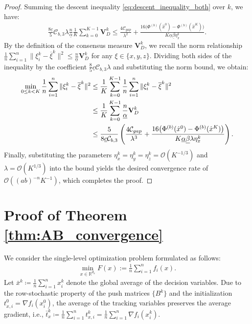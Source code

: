 \documentclass{article}
\theoremstyle{plain}
\theoremstyle{definition}
\theoremstyle{remark}
\begin{document}
\begin{proof}
 Summing the descent inequality \eqref{eq:descent_inequality_both} over $k$, we have:
    \begin{align*}
       \frac{8\underline{c}}{5}\mathcal{C}_{b,3}\lambda \frac{n}{\underline{\alpha}} \frac{1}{K}\sum_{k=0}^{K-1} \mathbf{V}_{D}^{k} \leq \frac{4\mathcal{C}_{gap}}{\lambda^{2}} + \frac{16\big(\Phi^{(b)}({\hat{x}}^{0}) - \Phi^{(b)}({\hat{x}}^{K}) \big)}{K \underline{\alpha}\underline{\beta}\eta_{x}^{k}}.
    \end{align*}
    By the definition of the consensus measure $\mathbf{V}_{D}^{k}$, we recall the norm relationship $\frac{1}{n}\sum_{i=1}^n \|\xi_i^k - \overline{\xi}^k\|^2 \leq \frac{n}{\underline{\alpha}} \mathbf{V}_{D}^{k}$ for any $\xi \in \{x, y, z\}$. Dividing both sides of the inequality by the coefficient $\frac{8}{5}\underline{c}\mathcal{C}_{b,3} \lambda$ and substituting the norm bound, we obtain:
    \begin{align}\label{consen_err_upper}
        \min_{0 \le k < K} \frac{1}{n} \sum_{i=1}^n \|\xi_i^k - \overline{\xi}^k\|^2 &\leq \frac{1}{K} \sum_{k=0}^{K-1} \frac{1}{n} \sum_{i=1}^n \|\xi_i^k - \overline{\xi}^k\|^2 \notag \\
        &\leq \frac{1}{K} \sum_{k=0}^{K-1}\frac{n}{\underline{\alpha}}\mathbf{V}_{D}^{k} \notag \\
        &\leq \frac{5}{8 \underline{c}\mathcal{C}_{b,3} } \left(\frac{4\mathcal{C}_{gap}}{\lambda^{3}} + \frac{16\big(\Phi^{(b)}({\hat{x}}^{0}) - \Phi^{(b)}({\hat{x}}^{K}) \big)}{K \underline{\alpha}\underline{\beta}\lambda\eta_{x}^{k}}\right).
    \end{align}
    Finally, substituting the parameters $\eta_{x}^{k}=\eta_{y}^{k}=\eta_{z}^{k}=\mathcal{O}\left(K^{-1/3}\right)$ and $\lambda=\mathcal{O}\left(K^{1/3}\right)$ into the bound yields the desired convergence rate of $\mathcal{O}\left( (ab)^{-n} K^{-1} \right)$, which completes the proof.
\end{proof}


\section{Proof of Theorem \ref{thm:AB_convergence}} 
\label{app:proof_ab}
We consider the single-level optimization problem formulated as follows:
\begin{align*}
    \min_{x \in \mathbb{R}^{d_x}} F(x):= \frac{1}{n} \sum_{i=1}^{n} f_{i}(x). 
\end{align*}
Let $\bar{x}^k \coloneqq \frac{1}{n}\sum_{i=1}^n x_i^k$ denote the global average of the decision variables. Due to the row-stochastic property of the push matrices $\{B^k\}$ and the initialization $t_{x,i}^0 = \nabla f_i(x_i^0)$, the average of the tracking variables preserves the average gradient, i.e., $\bar{t}_x^k \coloneqq \frac{1}{n}\sum_{i=1}^n t_{x,i}^k = \frac{1}{n}\sum_{i=1}^n \nabla f_i(x_i^k)$. 
\end{document}
